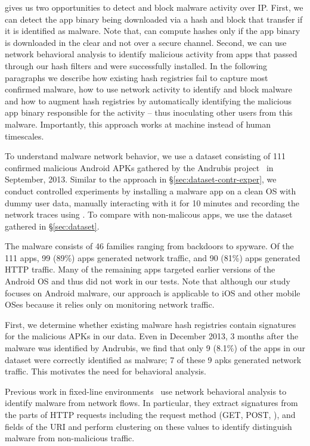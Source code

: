 \meddle gives us two opportunities to detect and block malware activity over IP. 
First, we can detect the app binary being downloaded via a hash and block that transfer if it is identified as malware. 
Note that, \meddle can compute hashes only if the app binary is downloaded in the clear and not over a secure channel.
Second, we can use network behavioral analysis to identify malicious activity from apps that passed through our hash filters and were successfully installed. 
In the following paragraphs we describe how existing hash registries fail to capture most confirmed malware, how to use network activity to identify and block malware and how to augment hash registries by automatically identifying the malicious app binary responsible for the activity -- thus inoculating other users from this malware. 
Importantly, this approach works at machine instead of human timescales.%

To understand malware network behavior, we use a dataset consisting of 111 confirmed malicious Android APKs gathered by the Andrubis project~\cite{andrubis} in September, 2013.  
Similar to the approach in \S\ref{sec:dataset-contr-exper}, we conduct controlled experiments by installing a malware app on a clean OS with dummy user data, manually interacting with it for 10 minutes and recording the network traces using \meddle. 
To compare with non-malicous apps, we use the dataset gathered in \S\ref{sec:dataset}.

The malware consists of 46 families ranging from backdoors to spyware. 
Of the 111 apps, 99 (89\%) apps generated network traffic, and 90 (81\%) apps generated HTTP traffic. 
Many of the remaining apps targeted earlier versions of the Android OS and thus did not work in our tests. 
Note that although our study focuses on Android malware, our approach is applicable to iOS and other mobile OSes because it relies only on monitoring network traffic.

First, we determine whether existing malware hash registries contain signatures for the malicious APKs in our data. 
Even in December 2013, 3 months after the malware was identified by Andrubis, we find that only 9 (8.1\%) of the apps in our dataset were correctly identified as malware; 7 of these 9 apks generated network traffic. 
This motivates the need for behavioral analysis.

Previous work in fixed-line environments~\cite{perdisci:malwaresig} use network behavioral analysis to identify malware 
from network flows. 
In particular, they extract signatures from the parts of HTTP requests including the request method (GET, POST, \etc), and fields of the URI and perform clustering on these values to identify distinguish malware from non-malicious traffic. 

